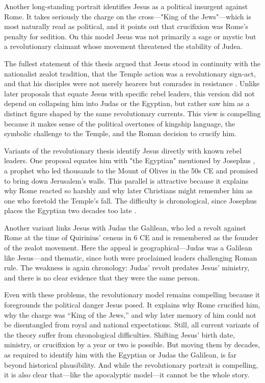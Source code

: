 Another long-standing portrait identifies Jesus as a political insurgent against Rome.
It takes seriously the charge on the cross---"King of the Jews"---which is most naturally read as political, and it points out that crucifixion was Rome's penalty for sedition.
On this model Jesus was not primarily a sage or mystic but a revolutionary claimant whose movement threatened the stability of Judea.

The fullest statement of this thesis argued that Jesus stood in continuity with the nationalist zealot tradition, that the Temple action was a revolutionary sign-act, and that his disciples were not merely hearers but comrades in resistance \cite{brandon:zealots,brandon:fall}.
Unlike later proposals that equate Jesus with specific rebel leaders, this version did not depend on collapsing him into Judas or the Egyptian, but rather saw him as a distinct figure shaped by the same revolutionary currents.
This view is compelling because it makes sense of the political overtones of kingship language, the symbolic challenge to the Temple, and the Roman decision to crucify him.

Variants of the revolutionary thesis identify Jesus directly with known rebel leaders.
One proposal equates him with "the Egyptian" mentioned by Josephus \cite[20.169--172]{josephus:ant}, a prophet who led thousands to the Mount of Olives in the 50s CE and promised to bring down Jerusalem's walls.
This parallel is attractive because it explains why Rome reacted so harshly and why later Christians might remember him as one who foretold the Temple’s fall.
The difficulty is chronological, since Josephus places the Egyptian two decades too late \cite[2.261--263]{josephus:war}.

Another variant links Jesus with Judas the Galilean, who led a revolt against Rome at the time of Quirinius' census in 6 CE \cite[18.1--10]{josephus:ant} and is remembered as the founder of the zealot movement.
Here the appeal is geographical---Judas was a Galilean like Jesus---and thematic, since both were proclaimed leaders challenging Roman rule.
The weakness is again chronology: Judas’ revolt predates Jesus’ ministry, and there is no clear evidence that they were the same person.

Even with these problems, the revolutionary model remains compelling because it foregrounds the political danger Jesus posed.
It explains why Rome crucified him, why the charge was “King of the Jews,” and why later memory of him could not be disentangled from royal and national expectations.
Still, all current variants of the theory suffer from chronological difficulties.
Shifting Jesus’ birth date, ministry, or crucifixion by a year or two is possible.
But moving them by decades, as required to identify him with the Egyptian or Judas the Galilean, is far beyond historical plausibility.
And while the revolutionary portrait is compelling, it is also clear that---like the apocalyptic model---it cannot be the whole story.

